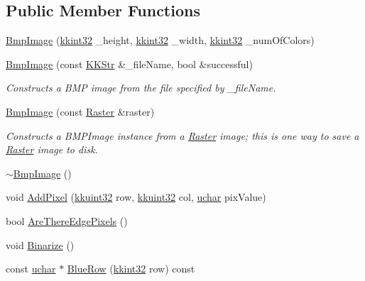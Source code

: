 \subsection*{Public Member Functions}
\begin{DoxyCompactItemize}
\item 
\hyperlink{class_k_k_b_1_1_bmp_image_abe1aec4ebeffe7bc960a85868310fe0f}{Bmp\+Image} (\hyperlink{namespace_k_k_b_a8fa4952cc84fda1de4bec1fbdd8d5b1b}{kkint32} \+\_\+height, \hyperlink{namespace_k_k_b_a8fa4952cc84fda1de4bec1fbdd8d5b1b}{kkint32} \+\_\+width, \hyperlink{namespace_k_k_b_a8fa4952cc84fda1de4bec1fbdd8d5b1b}{kkint32} \+\_\+num\+Of\+Colors)
\item 
\hyperlink{class_k_k_b_1_1_bmp_image_a5d34118309b6a7d06c5ce368be455f3e}{Bmp\+Image} (const \hyperlink{class_k_k_b_1_1_k_k_str}{K\+K\+Str} \&\+\_\+file\+Name, bool \&successful)
\begin{DoxyCompactList}\small\item\em Constructs a B\+MP image from the file specified by \textquotesingle{}\+\_\+file\+Name\textquotesingle{}. \end{DoxyCompactList}\item 
\hyperlink{class_k_k_b_1_1_bmp_image_a4909a1187900404c57b62ea87f164e57}{Bmp\+Image} (const \hyperlink{class_k_k_b_1_1_raster}{Raster} \&raster)
\begin{DoxyCompactList}\small\item\em Constructs a B\+M\+P\+Image instance from a \hyperlink{class_k_k_b_1_1_raster}{Raster} image; this is one way to save a \hyperlink{class_k_k_b_1_1_raster}{Raster} image to disk. \end{DoxyCompactList}\item 
\hyperlink{class_k_k_b_1_1_bmp_image_a6e919d5e31884577cb4f944217673559}{$\sim$\+Bmp\+Image} ()
\item 
void \hyperlink{class_k_k_b_1_1_bmp_image_ae55d99adbcfef1ce787b0f03353a2493}{Add\+Pixel} (\hyperlink{namespace_k_k_b_af8d832f05c54994a1cce25bd5743e19a}{kkuint32} row, \hyperlink{namespace_k_k_b_af8d832f05c54994a1cce25bd5743e19a}{kkuint32} col, \hyperlink{namespace_k_k_b_ace9969169bf514f9ee6185186949cdf7}{uchar} pix\+Value)
\item 
bool \hyperlink{class_k_k_b_1_1_bmp_image_a84b952d5e45b69cc76f1b0f548ac6aac}{Are\+There\+Edge\+Pixels} ()
\item 
void \hyperlink{class_k_k_b_1_1_bmp_image_a06b9cd777bb3731a4bc2b9fc7832f6b9}{Binarize} ()
\item 
const \hyperlink{namespace_k_k_b_ace9969169bf514f9ee6185186949cdf7}{uchar} $\ast$ \hyperlink{class_k_k_b_1_1_bmp_image_a8b6bd225b80088718f631a7646f0d7d5}{Blue\+Row} (\hyperlink{namespace_k_k_b_a8fa4952cc84fda1de4bec1fbdd8d5b1b}{kkint32} row) const 

\end{DoxyCompactItemize}
